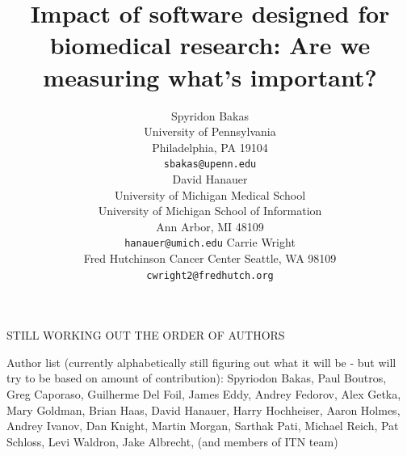\documentclass{article}
\title{Impact of software designed for biomedical research: Are we measuring what's important?}
\author{
Spyridon Bakas \\
    University of Pennsylvania \\
    Philadelphia, PA 19104 \\
    \texttt{sbakas@upenn.edu} \\
\AND
David Hanauer \\
    University of Michigan Medical School\\
    University of Michigan School of Information\\
    Ann Arbor, MI 48109\\
    \texttt{hanauer@umich.edu}
\AND
Carrie Wright \\
    Fred Hutchinson Cancer Center
    Seattle, WA 98109 \\
    \texttt{cwright2@fredhutch.org}\\
}
\begin{document}
 STILL WORKING OUT THE ORDER OF AUTHORS
 

\maketitle
Author list (currently alphabetically still figuring out what it will be - but will try to be based on amount of contribution):
Spyriodon Bakas, Paul Boutros, Greg Caporaso,  Guilherme Del Foil, James Eddy, Andrey Fedorov, Alex Getka, Mary Goldman, Brian Haas, David Hanauer, Harry Hochheiser, Aaron Holmes, Andrey Ivanov, Dan Knight, Martin Morgan, Sarthak Pati, Michael Reich, Pat Schloss, Levi Waldron, Jake Albrecht, (and members of ITN team)




\end{document}
